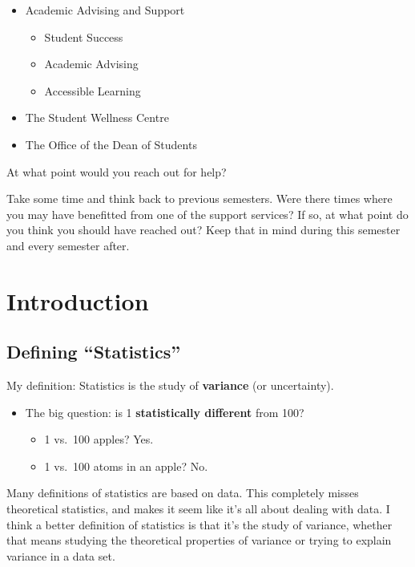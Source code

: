 \documentclass[
  letterpaper,
  DIV=11,
  numbers=noendperiod]{scrreprt}
\providecommand{\tightlist}{%
  \setlength{\itemsep}{0pt}\setlength{\parskip}{0pt}}\usepackage{longtable,booktabs,array}
\begin{document}
\begin{itemize}
\tightlist
\item
  Academic Advising and Support

  \begin{itemize}
  \tightlist
  \item
    Student Success
  \item
    Academic Advising
  \item
    Accessible Learning\lspace
  \end{itemize}
\item
  The Student Wellness Centre\lspace
\item
  The Office of the Dean of Students
\end{itemize}

\pspace

At what point would you reach out for help?

Take some time and think back to previous semesters. Were there times
where you may have benefitted from one of the support services? If so,
at what point do you think you should have reached out? Keep that in
mind during this semester and every semester after.

\hypertarget{introduction}{%
\chapter{Introduction}\label{introduction}}

\hypertarget{defining-statistics}{%
\section{Defining ``Statistics''}\label{defining-statistics}}

My definition: Statistics is the study of \textbf{variance} (or
uncertainty).

\pspace

\begin{itemize}
\tightlist
\item
  The big question: is 1 \textbf{statistically different} from
  100?\pause

  \begin{itemize}
  \tightlist
  \item
    1 vs.~100 apples? Yes.
  \item
    1 vs.~100 atoms in an apple? No.
  \end{itemize}
\end{itemize}

Many definitions of statistics are based on data. This completely misses
theoretical statistics, and makes it seem like it's all about dealing
with data. I think a better definition of statistics is that it's the
study of variance, whether that means studying the theoretical
properties of variance or trying to explain variance in a data set.
\end{document}
